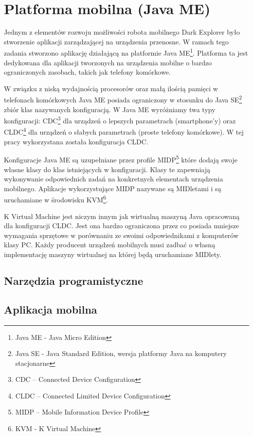 \section{Platforma mobilna (Java ME)}
\label{sec:javame-app}
Jednym z elementów rozwoju możliwości robota mobilnego Dark Explorer było
stworzenie aplikacji zarządzającej na urządzenia przenosne. W ramach tego zadania
stworzono aplikację działającą na platformie Java ME\footnote{Java ME - Java
Micro Edition}. Platforma ta jest dedykowana dla aplikacji tworzonych na
urządzenia mobilne o bardzo ograniczonych zasobach, takich jak telefony
komórkowe.

W związku z niską wydajnością procesorów oraz małą ilością pamięci w telefonach
komórkowych Java ME posiada ograniczony w stosunku do Java SE\footnote{Java SE -
Java Standard Edition, wersja platformy Java na komputery stacjonarne} zbiór klas
nazywanych konfiguracją. W Java ME wyróżniamy twa typy konfiguracji:
CDC\footnote{CDC -- Connected Device Configuration} dla urządzeń o lepszych
parametrach (smartphone'y) oraz CLDC\footnote{CLDC -- Connected Limited Device
Configuration} dla urządzeń o słabych parametrach (proste telefony komórkowe). W
tej pracy wykorzystana została konfiguracja CLDC.

Konfiguracje Java ME są uzupełniane przez profile MIDP\footnote{MIDP -- Mobile
Information Device Profile} które dodają swoje własne klasy do klas istniejących
w konfiguracji. Klasy te zapewniają wykonywanie odpowiednich zadań na konkretnych
elementach urządzenia mobilnego. Aplikacje wykorzystujące MIDP nazywane są
MIDletami i są uruchamiane w środowisku KVM\footnote{KVM - K Virtual Machine}.

K Virtual Machine jest niczym innym jak wirtualną maszyną Java opracowaną dla
konfiguracji CLDC. Jest ona bardzo ograniczona przez co posiada mniejsze
wymagania sprzętowe w porównaniu ze swoimi odpowiednikami z komputerów klasy PC.
Każdy producent urządzeń mobilnych musi zadbać o własną implementację maszyny
wirtualnej na której będą uruchamiane MIDlety.
\subsection{Narzędzia programistyczne}

\subsection{Aplikacja mobilna}